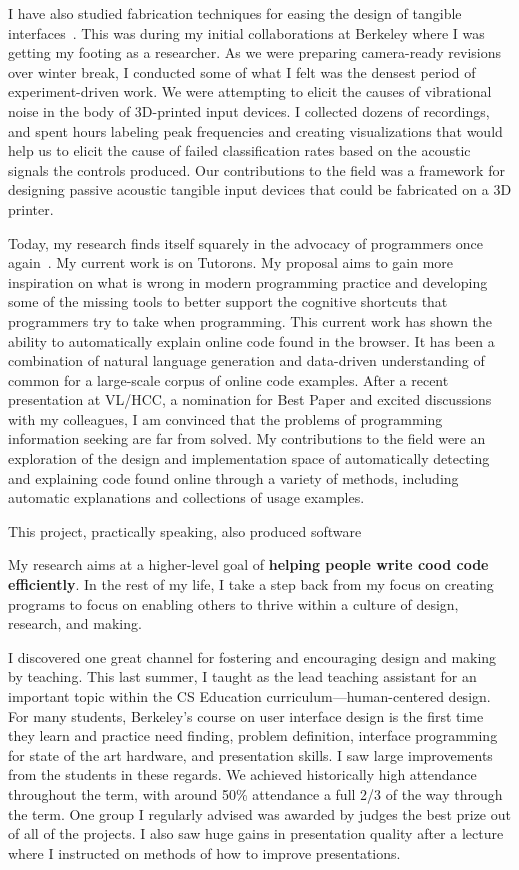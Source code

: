 \documentclass[12pt]{memoir}
\begin{document}
I have also studied fabrication techniques for easing the design of tangible interfaces~\cite{savage_lamello_2015}.
This was during my initial collaborations at Berkeley where I was getting my footing as a researcher.
As we were preparing camera-ready revisions over winter break, I conducted some of what I felt was the densest period of experiment-driven work.
We were attempting to elicit the causes of vibrational noise in the body of 3D-printed input devices.
I collected dozens of recordings, and spent hours labeling peak frequencies and creating visualizations that would help us to elicit the cause of failed classification rates based on the acoustic signals the controls produced.
Our contributions to the field was a framework for designing passive acoustic tangible input devices that could be fabricated on a 3D printer.

Today, my research finds itself squarely in the advocacy of programmers once again~\cite{head_tutorons_2015}.
My current work is on Tutorons.
My proposal aims to gain more inspiration on what is wrong in modern programming practice and developing some of the missing tools to better support the cognitive shortcuts that programmers try to take when programming.
This current work has shown the ability to automatically explain online code found in the browser.
It has been a combination of natural language generation and data-driven understanding of common for a large-scale corpus of online code examples.
After a recent presentation at VL/HCC, a nomination for Best Paper and excited discussions with my colleagues, I am convinced that the problems of programming information seeking are far from solved.
My contributions to the field were an exploration of the design and implementation space of automatically detecting and explaining code found online through a variety of methods, including automatic explanations and collections of usage examples.

This project, practically speaking, also produced software


My research aims at a higher-level goal of \textbf{helping people write cood code efficiently}.
In the rest of my life, I take a step back from my focus on creating programs to focus on enabling others to thrive within a culture of design, research, and making.

I discovered one great channel for fostering and encouraging design and making by teaching.
This last summer, I taught as the lead teaching assistant for an important topic within the CS Education curriculum---human-centered design.
For many students, Berkeley's course on user interface design is the first time they learn and practice need finding, problem definition, interface programming for state of the art hardware, and presentation skills.
I saw large improvements from the students in these regards.
We achieved historically high attendance throughout the term, with around 50\% attendance a full 2/3 of the way through the term.
One group I regularly advised was awarded by judges the best prize out of all of the projects.
I also saw huge gains in presentation quality after a lecture where I instructed on methods of how to improve presentations.
\end{document}
